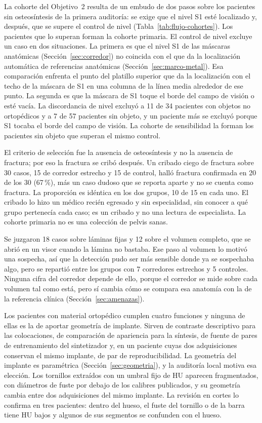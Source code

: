 La cohorte del Objetivo~2 resulta de un embudo de dos pasos sobre los pacientes sin osteosíntesis de la primera auditoría: se exige que el nivel S1 esté localizado y, después, que se supere el control de nivel (Tabla~\ref{tab:flujo-cohortes}). Los pacientes que lo superan forman la cohorte primaria. El control de nivel excluye un caso en dos situaciones. La primera es que el nivel S1 de las máscaras anatómicas (Sección~\ref{sec:corredor}) no coincida con el que da la localización automática de referencias anatómicas (Sección~\ref{sec:marco-metal}). Esa comparación enfrenta el punto del platillo superior que da la localización con el techo de la máscara de S1 en una columna de la línea media alrededor de ese punto. La segunda es que la máscara de S1 toque el borde del campo de visión o esté vacía. La discordancia de nivel excluyó a 11 de 34 pacientes con objetos no ortopédicos y a 7 de 57 pacientes sin objeto, y un paciente más se excluyó porque S1 tocaba el borde del campo de visión. La cohorte de sensibilidad la forman los pacientes sin objeto que superan el mismo control.

El criterio de selección fue la ausencia de osteosíntesis y no la ausencia de fractura; por eso la fractura se cribó después. Un cribado ciego de fractura sobre 30 casos, 15 de corredor estrecho y 15 de control, halló fractura confirmada en 20 de los 30 (67\,\%), más un caso dudoso que se reporta aparte y no se cuenta como fractura. La proporción es idéntica en los dos grupos, 10 de 15 en cada uno. El cribado lo hizo un médico recién egresado y sin especialidad, sin conocer a qué grupo pertenecía cada caso; es un cribado y no una lectura de especialista. La cohorte primaria no es una colección de pelvis sanas.

Se juzgaron 18 casos sobre láminas fijas y 12 sobre el volumen completo, que se abrió en un visor cuando la lámina no bastaba. Ese paso al volumen lo motivó una sospecha, así que la detección pudo ser más sensible donde ya se sospechaba algo, pero se repartió entre los grupos con 7 corredores estrechos y 5 controles. Ninguna cifra del corredor depende de ello, porque el corredor se mide sobre cada volumen tal como está, pero sí cambia cómo se compara esa anatomía con la de la referencia clínica (Sección~\ref{sec:amenazas}).

Los pacientes con material ortopédico cumplen cuatro funciones y ninguna de ellas es la de aportar geometría de implante. Sirven de contraste descriptivo para las colocaciones, de comparación de apariencia para la síntesis, de fuente de pares de entrenamiento del sintetizador y, en un paciente cuyas dos adquisiciones conservan el mismo implante, de par de reproducibilidad. La geometría del implante es paramétrica (Sección~\ref{sec:geometria}), y la auditoría local motiva esa elección. Los tornillos extraídos con un umbral fijo de HU aparecen fragmentados, con diámetros de fuste por debajo de los calibres publicados, y su geometría cambia entre dos adquisiciones del mismo implante. La revisión en cortes lo confirma en tres pacientes: dentro del hueso, el fuste del tornillo o de la barra tiene HU bajos y algunos de sus segmentos se confunden con el hueso.

